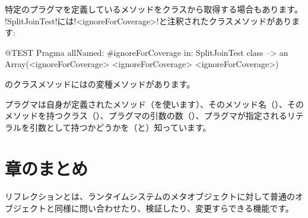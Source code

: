 \documentclass[a4paper,10pt,twoside]{book}
\begin{document}
特定のプラグマを定義しているメソッドをクラスから取得する場合もあります。
\ct!SplitJoinTest!には\ct!<ignoreForCoverage>!と注釈されたクラスメソッドがあります:

\begin{code}{@TEST}
Pragma allNamed: #ignoreForCoverage in: SplitJoinTest class  --> an Array(<ignoreForCoverage> <ignoreForCoverage> <ignoreForCoverage>)
\end{code}

のクラスメソッドにはの変種メソッドがあります。

プラグマは自身が定義されたメソッド（を使います）、そのメソッド名（）、そのメソッドを持つクラス（）、プラグマの引数の数（）、プラグマが指定されるリテラルを引数として持つかどうかを（と）知っています。


\section{章のまとめ}

リフレクションとは、ランタイムシステムのメタオブジェクトに対して普通のオブジェクトと同様に問い合わせたり、検証したり、変更すらできる機能です。
\end{document}
